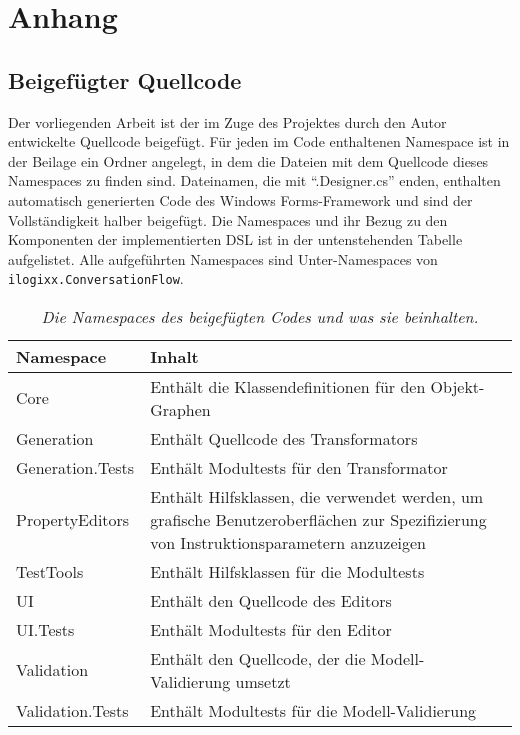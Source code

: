 \chapter{Anhang}

\section{Beigefügter Quellcode}
Der vorliegenden Arbeit ist der im Zuge des Projektes durch den Autor entwickelte Quellcode beigefügt. Für jeden im Code enthaltenen Namespace ist in der Beilage ein Ordner angelegt, in dem die Dateien mit dem Quellcode dieses Namespaces zu finden sind. Dateinamen, die mit ``.Designer.cs''  enden, enthalten automatisch generierten Code des Windows Forms-Framework und sind der Vollständigkeit halber beigefügt. Die Namespaces und ihr Bezug zu den Komponenten der implementierten DSL ist in der untenstehenden Tabelle aufgelistet. Alle aufgeführten Namespaces sind Unter-Namespaces von \texttt{ilogixx.ConversationFlow}.

\begin{table}[hbtp]
\centering
\settowidth{}
\begin{tabulary}{1.0\textwidth}{L|L}
\textbf{Namespace} & \textbf{Inhalt} \\
\hline

Core & Enthält die Klassendefinitionen für den Objekt-Graphen \\
\hline

Generation & Enthält Quellcode des Transformators \\
\hline

Generation.Tests & Enthält Modultests für den Transformator\\
\hline

PropertyEditors & Enthält Hilfsklassen, die verwendet werden, um grafische Benutzeroberflächen zur Spezifizierung von Instruktionsparametern anzuzeigen \\
\hline

TestTools & Enthält Hilfsklassen für die Modultests\\
\hline

UI & Enthält den Quellcode des Editors \\
\hline

UI.Tests & Enthält Modultests für den Editor \\
\hline

Validation & Enthält den Quellcode, der die Modell-Validierung umsetzt \\
\hline

Validation.Tests & Enthält Modultests für die Modell-Validierung \\

\end{tabulary}
\caption{\textit{Die Namespaces des beigefügten Codes und was sie beinhalten.}}
\label{tab:namespaces}
\end{table}